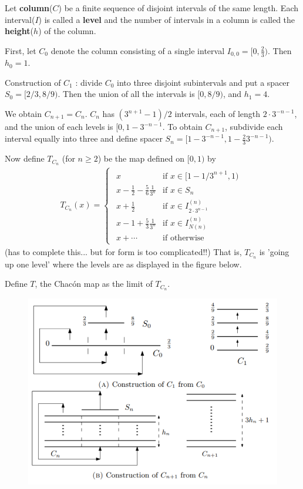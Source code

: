 \documentclass[12pt,a4paper]{report}
\begin{document}
Let \textbf{column}($C$) be a finite sequence of disjoint intervals of the same length. Each interval($I$) is called a \textbf{level} and the number of intervals in a column is called the \textbf{height}($h$) of the column.
\s

First, let $C_0$ denote the column consisting of a single interval $I_{0,0} = [0,\frac{2}{3})$. Then $h_0 =1$.
\s

Construction of $C_1$ : divide $C_0$ into three disjoint subintervals and put a spacer $S_0 = [2/3, 8/9)$. Then the union of all the intervals is $[0,8/9)$, and $h_1 =4$.
\s

We obtain $C_{n+1} = C_{n}$. $C_n$ has $(3^{n+1}-1)/2$ intervals, each of length $2\cdot 3^{-n-1}$, and the union of each levels is $[0,1-3^{-n-1}$. To obtain $C_{n+1}$, subdivide each interval equally into three and define spacer $S_n = [1-3^{-n-1},1- \frac{2}{3}3^{-n-1})$.
\s

Now define $T_{C_n}$ (for $n\geq 2$) be the map defined on $[0,1)$ by
\begin{align*}
T_{C_n}(x) = \begin{cases} \begin{array}{cl}
x & \text{if } x\in [1-1/3^{n+1},1) \\
x - \frac{1}{2} - \frac{5}{6} \frac{1}{3^n} & \text{if } x\in S_n \\
x + \frac{1}{2} & \text{if } x\in I^{(n)}_{2\cdot 3^{n-1}} \\
x- 1 + \frac{5}{3} \frac{1}{3^n} & \text{if } x\in I^{(n)}_{N(n)} \\
x + \cdots & \text{if otherwise}  
\end{array}
\end{cases}
\end{align*}
(has to complete this... but for form is too complicated!!) That is, $T_{C_n}$ is 'going up one level' where the levels are as displayed in the figure below.
\s

Define $T$, the Chac\'{o}n map as the limit of $T_{C_n}$.

\begin{figure}[h]
	\centering
	\includegraphics[scale=0.66]{2}
\end{figure}
\s
\end{document}

